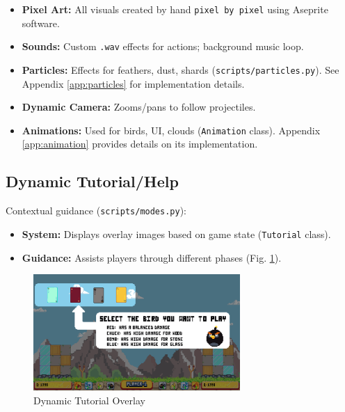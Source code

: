\documentclass[11pt, a4paper]{article}
\begin{document}
\begin{itemize}

    \item \textbf{Pixel Art:} All visuals created by hand \texttt{pixel by pixel} using Aseprite software.
    
    \item \textbf{Sounds:} Custom \texttt{.wav} effects for actions; background music loop.
    
    \item \textbf{Particles:} Effects for feathers, dust, shards (\texttt{scripts/particles.py}). See Appendix \ref{app:particles} for implementation details.
    
    \item \textbf{Dynamic Camera:} Zooms/pans to follow projectiles.
    
    \item \textbf{Animations:} Used for birds, UI, clouds (\texttt{Animation} class). Appendix \ref{app:animation} provides details on its implementation.

\end{itemize}

\subsection{Dynamic Tutorial/Help}

Contextual guidance (\texttt{scripts/modes.py}):

\begin{itemize}

    \item \textbf{System:} Displays overlay images based on game state (\texttt{Tutorial} class).
    
    \item \textbf{Guidance:} Assists players through different phases (Fig. \ref{fig:tutorial_a}).

\end{itemize}

\begin{figure}[h!]

    \centering
    
    \includegraphics[width=0.7\textwidth]{images/tutorial.png}
    
    \caption{Dynamic Tutorial Overlay}
    
    \label{fig:tutorial_a}

\end{figure}
\end{document}
